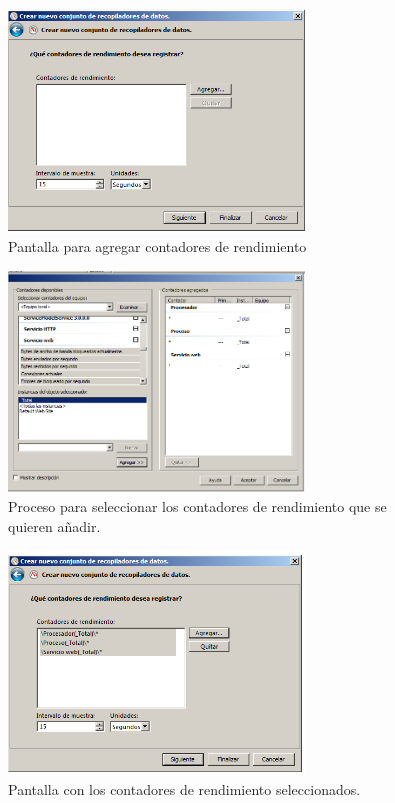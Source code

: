 \begin{figure}[H]
  \begin{center}
    \includegraphics[width=0.7\textwidth]{imagenes/rec3_5}
    \caption{Pantalla para agregar contadores de rendimiento}
    \label{fig8}
  \end{center}
\end{figure}

\begin{figure}[H]
  \begin{center}
    \includegraphics[width=0.7\textwidth]{imagenes/rec4}
    \caption{Proceso para seleccionar los contadores de rendimiento que se quieren añadir.}
    \label{fig9}
  \end{center}
\end{figure}

\begin{figure}[H]
  \begin{center}
    \includegraphics[width=0.7\textwidth]{imagenes/rec5}
    \caption{Pantalla con los contadores de rendimiento seleccionados.}
    \label{fig10}
  \end{center}
\end{figure}

